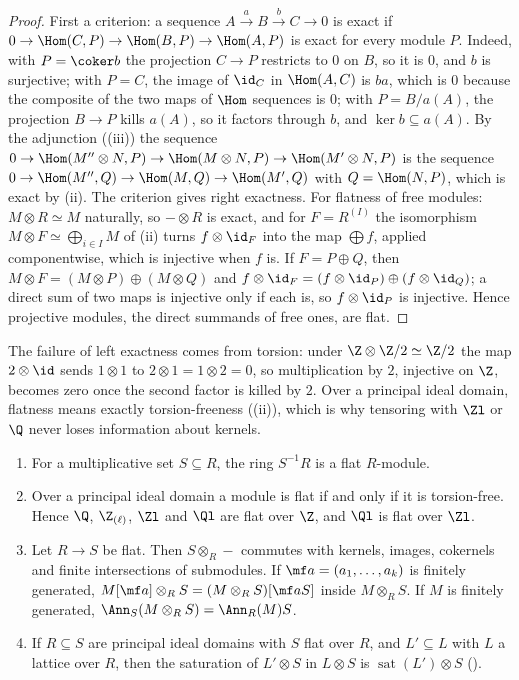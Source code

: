 \begin{proof}
First a criterion: a sequence $A\xrightarrow{a}B\xrightarrow{b}C\to0$ is exact if $0\to\Hom(C,P)\to\Hom(B,P)\to\Hom(A,P)$ is exact for every
module $P$. Indeed, with $P=\coker b$ the projection $C\to P$ restricts to $0$ on $B$, so it is $0$, and $b$ is surjective; with
$P=C$, the image of $\id_C$ in $\Hom(A,C)$ is $ba$, which is $0$ because the composite of the two maps of $\Hom$ sequences is
$0$; with $P=B/a(A)$, the projection $B\to P$ kills $a(A)$, so it factors through $b$, and $\ker b\subseteq a(A)$.
By the adjunction ((iii)) the sequence $0\to\Hom(M''\otimes N,P)\to\Hom(M\otimes N,P)\to\Hom(M'\otimes N,P)$ is
the sequence $0\to\Hom(M'',Q)\to\Hom(M,Q)\to\Hom(M',Q)$ with $Q=\Hom(N,P)$, which is exact by (ii).
The criterion gives right exactness. For flatness of free modules: $M\otimes R\simeq M$ naturally, so $-\otimes R$ is exact, and for
$F=R^{(I)}$ the isomorphism $M\otimes F\simeq\bigoplus_{i\in I}M$ of (ii) turns $f\otimes\id_F$ into the map $\bigoplus f$, applied
componentwise, which is injective when $f$ is. If $F=P\oplus Q$, then $M\otimes F=(M\otimes P)\oplus(M\otimes Q)$ and $f\otimes\id_F=(f\otimes\id_P)\oplus(f\otimes\id_Q)$;
a direct sum of two maps is injective only if each is, so $f\otimes\id_P$ is injective. Hence projective modules, the direct summands of
free ones, are flat.
\end{proof}

The failure of left exactness comes from torsion: under $\Z\otimes\Z/2\simeq\Z/2$ the map $2\otimes\id$ sends $1\otimes1$ to
$2\otimes1=1\otimes2=0$, so multiplication by $2$, injective on $\Z$, becomes zero once the second factor is killed by $2$. Over a
principal ideal domain, flatness means exactly torsion-freeness
((ii)), which is why tensoring with $\Zl$ or $\Q$ never loses information about kernels.

\begin{proposition}[flatness]\label{prop:modules:flat}
\begin{enumerate}[label=(\roman*)]
\item For a multiplicative set $S\subseteq R$, the ring $S^{-1}R$ is a flat $R$-module.
\item Over a principal ideal domain a module is flat if and only if it is torsion-free. Hence $\Q$, $\Z_{(\ell)}$, $\Zl$ and $\Ql$
are flat over $\Z$, and $\Ql$ is flat over $\Zl$.
\item Let $R\to S$ be flat. Then $S\otimes_R-$ commutes with kernels, images, cokernels and finite intersections of submodules.
If $\mf a=(a_1,\dots,a_k)$ is finitely generated, $M[\mf a]\otimes_RS=(M\otimes_RS)[\mf aS]$ inside $M\otimes_RS$. If $M$ is finitely
generated, $\Ann_S(M\otimes_RS)=\Ann_R(M)S$.
\item If $R\subseteq S$ are principal ideal domains with $S$ flat over $R$, and $L'\subseteq L$ with $L$ a lattice over $R$, then
the saturation of $L'\otimes S$ in $L\otimes S$ is $\operatorname{sat}(L')\otimes S$ ().
\end{enumerate}
\end{proposition}

